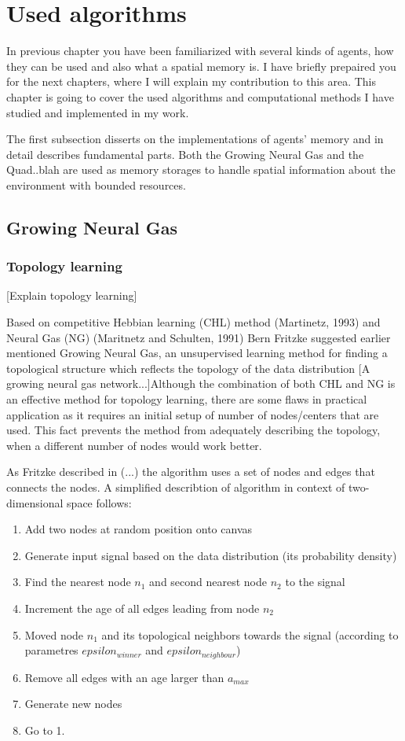 \chapter{Used algorithms}

In previous chapter you have been familiarized with several kinds of agents, how they can be used and also what a spatial memory is. I have briefly prepaired you for the next chapters, where I will explain my contribution to this area. This chapter is going to cover the used algorithms and computational methods I have studied and implemented in my work. 

The first subsection disserts on the implementations of agents' memory and in detail describes fundamental parts. Both the Growing Neural Gas and the Quad..blah are used as memory storages to handle spatial information about the environment with bounded resources.

\section{Growing Neural Gas}

\subsection{Topology learning}

[Explain topology learning]

Based on competitive Hebbian learning (CHL) method (Martinetz, 1993) and Neural Gas (NG) (Maritnetz and Schulten, 1991) Bern Fritzke suggested earlier mentioned Growing Neural Gas, an unsupervised learning method for finding a topological structure which reflects the topology of the data distribution [A growing neural gas network...]Although the combination of both CHL and NG is an effective method for topology learning, there are some flaws in practical application as it requires an initial setup of number of nodes/centers that are used. This fact prevents the method from adequately describing the topology, when a different number of nodes would work better.

As Fritzke described in (...) the algorithm uses a set of nodes and edges that connects the nodes. A simplified describtion of algorithm in context of two-dimensional space follows:

\begin{enumerate}
\item Add two nodes at random position onto canvas
\item Generate input signal based on the data distribution (its probability density)
\item Find the nearest node $n_1$ and second nearest node $n_2$ to the signal
\item Increment the age of all edges leading from node $n_2$
\item Moved node $n_1$ and its topological neighbors towards the signal (according to parametres $epsilon_{winner}$ and $epsilon_{neighbour}$)
\item Remove all edges with an age larger than $a_{max}$
\item Generate new nodes
\item Go to 1.
\end{enumerate}

